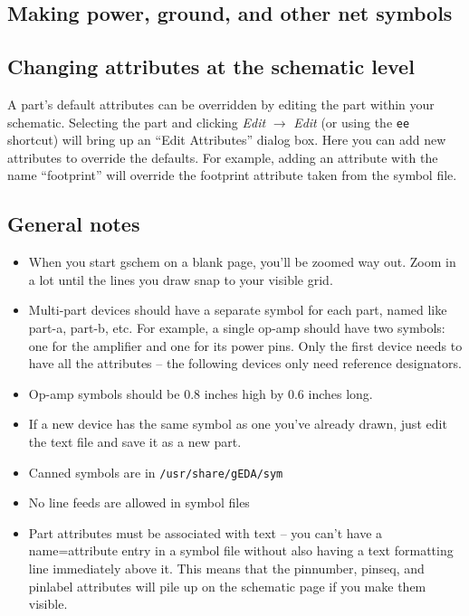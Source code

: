 


\clearpage
\subsection{Making power, ground, and other net symbols}


\clearpage
\subsection{Changing attributes at the schematic level}
A part's default attributes can be overridden by editing the part
within your schematic.  Selecting the part and clicking \textsl{Edit}
$\rightarrow$ \textsl{Edit} (or using the \texttt{ee} shortcut) will
bring up an ``Edit Attributes'' dialog box.  Here you can add new
attributes to override the defaults.  For example, adding an attribute
with the name ``footprint'' will override the footprint attribute
taken from the symbol file.

\subsection{General notes}
\begin{itemize}
\item When you start gschem on a blank page, you'll be zoomed way out.
  Zoom in a lot until the lines you draw snap to your visible grid.
\item Multi-part devices should have a separate symbol for each part,
  named like part-a, part-b, etc.  For example, a single op-amp should
  have two symbols: one for the amplifier and one for its power pins.
  Only the first device needs to have all the attributes -- the
  following devices only need reference designators.
\item Op-amp symbols should be 0.8 inches high by 0.6 inches long.
\item If a new device has the same symbol as one you've already drawn,
  just edit the text file and save it as a new part.
\item Canned symbols are in \texttt{/usr/share/gEDA/sym}
\item No line feeds are allowed in symbol files
\item Part attributes must be associated with text -- you can't have a
  name=attribute entry in a symbol file without also having a text
  formatting line immediately above it.  This means that the
  pinnumber, pinseq, and pinlabel attributes will pile up on the
  schematic page if you make them visible.
\end{itemize}



